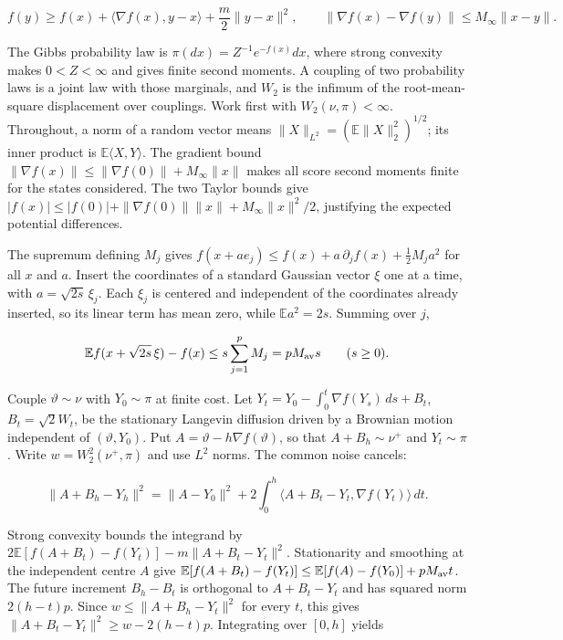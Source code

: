 \documentclass[11pt,a4paper]{report}
\begin{document}
\[f(y)\ge f(x)+\langle\nabla f(x),y-x\rangle+\frac m2\|y-x\|^2,\qquad\|\nabla f(x)-\nabla f(y)\|\le M_\infty\|x-y\|.\]

The Gibbs probability law is \(\pi(dx)=Z^{-1}e^{-f(x)}dx\), where strong convexity makes \(0<Z<\infty\) and gives finite second moments. A coupling of two probability laws is a joint law with those marginals, and \(W_2\) is the infimum of the root-mean-square displacement over couplings. Work first with \(W_2(\nu,\pi)<\infty\). Throughout, a norm of a random vector means \(\|X\|_{L^2}=(\mathbb E\|X\|_2^2)^{1/2}\); its inner product is \(\mathbb E\langle X,Y\rangle\). The gradient bound \(\|\nabla f(x)\|\le\|\nabla f(0)\|+M_\infty\|x\|\) makes all score second moments finite for the states considered. The two Taylor bounds give \(|f(x)|\le|f(0)|+\|\nabla f(0)\|\|x\|+M_\infty\|x\|^2/2\), justifying the expected potential differences.




The
supremum defining \(M_j\) gives
\(f(x+ae_j)\le f(x)+a\,\partial_jf(x)+\tfrac12M_ja^2\) for all \(x\) and
\(a\). Insert the coordinates of a standard Gaussian vector \(\xi\) one at a
time, with \(a=\sqrt{2s}\,\xi_j\). Each \(\xi_j\) is centered and independent
of the coordinates already inserted, so its linear term has mean zero, while
\(\mathbb E a^2=2s\). Summing over \(j\),


\[\mathbb E f(x+\sqrt{2s}\,\xi)-f(x)\le s\sum_{j=1}^pM_j=pM_{\rm av}s
\qquad(s\ge0).\]


Couple \(\vartheta\sim\nu\) with \(Y_0\sim\pi\) at finite cost. Let
\(Y_t=Y_0-\int_0^t\nabla f(Y_s)\,ds+B_t\), \(B_t=\sqrt2W_t\), be the
stationary Langevin diffusion driven by a Brownian motion independent of
\((\vartheta,Y_0)\). Put \(A=\vartheta-h\nabla f(\vartheta)\), so that
\(A+B_h\sim\nu^+\) and \(Y_t\sim\pi\). Write \(w=W_2^2(\nu^+,\pi)\) and use
\(L^2\) norms. The common noise cancels:


\[\|A+B_h-Y_h\|^2=\|A-Y_0\|^2+2\int_0^h\langle A+B_t-Y_t,\nabla f(Y_t)\rangle\,dt.\]


Strong convexity bounds the integrand by
\(2\mathbb E[f(A+B_t)-f(Y_t)]-m\|A+B_t-Y_t\|^2\). Stationarity and smoothing at
the independent centre \(A\) give
\(\mathbb E[f(A+B_t)-f(Y_t)]\le\mathbb E[f(A)-f(Y_0)]+pM_{\rm av}t\). The
future increment \(B_h-B_t\) is orthogonal to \(A+B_t-Y_t\) and has squared
norm \(2(h-t)p\). Since \(w\le\|A+B_h-Y_t\|^2\) for every \(t\), this gives
\(\|A+B_t-Y_t\|^2\ge w-2(h-t)p\). Integrating over \([0,h]\) yields
\end{document}
